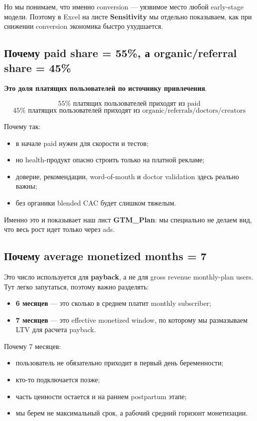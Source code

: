 \documentclass[10pt,a4paper]{article}
\begin{document}
Но мы понимаем, что именно conversion --- уязвимое место любой early-stage модели. Поэтому в Excel на листе \textbf{Sensitivity} мы отдельно показываем, как при снижении conversion экономика быстро ухудшается.

\subsection{Почему paid share = 55\%, а organic/referral share = 45\%}

\textbf{Это доля платящих пользователей по источнику привлечения}.

\[
55\% \text{ платящих пользователей приходят из paid}
\]
\[
45\% \text{ платящих пользователей приходят из organic/referrals/doctors/creators}
\]

Почему так:
\begin{itemize}
    \item в начале paid нужен для скорости и тестов;
    \item но health-продукт опасно строить только на платной рекламе;
    \item доверие, рекомендации, word-of-mouth и doctor validation здесь реально важны;
    \item без органики blended CAC будет слишком тяжелым.
\end{itemize}

Именно это и показывает наш лист \textbf{GTM\_Plan}: мы специально не делаем вид, что весь рост идет только через ads.

\subsection{Почему average monetized months = 7}

Это число используется для \textbf{payback}, а не для gross revenue monthly-plan users.  
Тут легко запутаться, поэтому важно разделять:

\begin{itemize}
    \item \textbf{6 месяцев} --- это сколько в среднем платит monthly subscriber;
    \item \textbf{7 месяцев} --- это effective monetized window, по которому мы размазываем LTV для расчета payback.
\end{itemize}

Почему 7 месяцев:
\begin{itemize}
    \item пользователь не обязательно приходит в первый день беременности;
    \item кто-то подключается позже;
    \item часть ценности остается и на раннем postpartum этапе;
    \item мы берем не максимальный срок, а рабочий средний горизонт монетизации.
\end{itemize}
\end{document}
